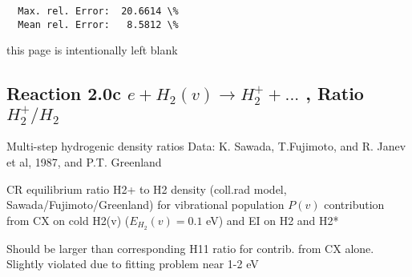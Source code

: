 \documentclass[12pt,dvipdfmx]{article}
\begin{document}
\begin{small}
\begin{verbatim}
  Max. rel. Error:  20.6614 \%
  Mean rel. Error:   8.5812 \%

\end{verbatim}\end{small}
\newpage
this page is intentionally left blank
\texttt{}
\newpage

\subsection{
Reaction 2.0c   $e +  H_2(v) \rightarrow H_2^+ + ... $ , Ratio \ $H_2^+/H_2$
}
 Multi-step hydrogenic density ratios
 Data: K. Sawada, T.Fujimoto, \cite{kn:Sawada} and R. Janev et al, 1987, and P.T. Greenland


  CR equilibrium ratio H2+ to H2 density
  (coll.rad model, Sawada/Fujimoto/Greenland) for vibrational population $P(v)$
  contribution from CX on cold H2(v) ($E_{H_2}(v)=0.1$ eV) and EI on H2 and H2*


Should be larger than corresponding H11 ratio for contrib. from CX alone.
Slightly violated due to fitting problem near 1-2 eV
\end{document}
